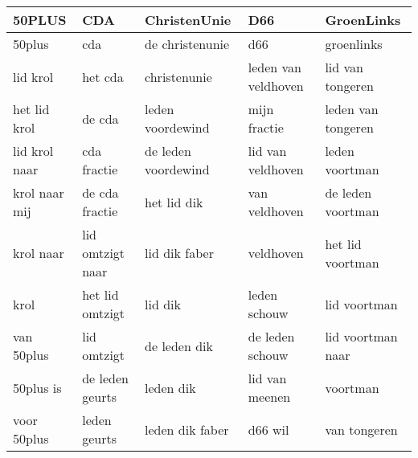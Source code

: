 \begin{tabular}{lllll}
\toprule
        50PLUS &               CDA &         ChristenUnie &                  D66 &          GroenLinks \\
\midrule
        50plus &               cda &      de christenunie &                  d66 &          groenlinks \\
      lid krol &           het cda &         christenunie &  leden van veldhoven &    lid van tongeren \\
  het lid krol &            de cda &     leden voordewind &         mijn fractie &  leden van tongeren \\
 lid krol naar &       cda fractie &  de leden voordewind &    lid van veldhoven &      leden voortman \\
 krol naar mij &    de cda fractie &          het lid dik &        van veldhoven &   de leden voortman \\
     krol naar &  lid omtzigt naar &        lid dik faber &            veldhoven &    het lid voortman \\
          krol &   het lid omtzigt &              lid dik &         leden schouw &        lid voortman \\
    van 50plus &       lid omtzigt &         de leden dik &      de leden schouw &   lid voortman naar \\
     50plus is &   de leden geurts &            leden dik &       lid van meenen &            voortman \\
   voor 50plus &      leden geurts &      leden dik faber &              d66 wil &        van tongeren \\
\bottomrule
\end{tabular}
